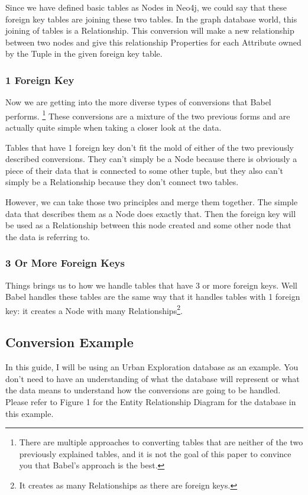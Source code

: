 \documentclass{acm_proc_article-sp}
\begin{document}
Since we have defined basic tables as Nodes in Neo4j, we could say that these foreign key tables are joining these two tables. In the graph database world, this joining of tables is a Relationship. This conversion will make a new relationship between two nodes and give this relationship Properties for each Attribute owned by the Tuple in the given foreign key table.

\subsubsection{1 Foreign Key}

Now we are getting into the more diverse types of conversions that Babel performs. \footnote{There are multiple approaches to converting tables that are neither of the two previously explained tables, and it is not the goal of this paper to convince you that Babel's approach is the best.} These conversions are a mixture of the two previous forms and are actually quite simple when taking a closer look at the data.

Tables that have 1 foreign key don't fit the mold of either of the two previously described conversions. They can't simply be a Node because there is obviously a piece of their data that is connected to some other tuple, but they also can't simply be a Relationship because they don't connect two tables. 

However, we can take those two principles and merge them together. The simple data that describes them as a Node does exactly that. Then the foreign key will be used as a Relationship between this node created and some other node that the data is referring to.

\subsubsection{3 Or More Foreign Keys}

Things brings us to how we handle tables that have 3 or more foreign keys. Well Babel handles these tables are the same way that it handles tables with 1 foreign key: it creates a Node with many Relationships\footnote{It creates as many Relationships as there are foreign keys.}.

\subsection{Conversion Example}

In this guide, I will be using an Urban Exploration database as an example. You don't need to have an understanding of what the database will represent or what the data means to understand how the conversions are going to be handled. Please refer to Figure 1 for the Entity Relationship Diagram for the database in this example.
\end{document}
